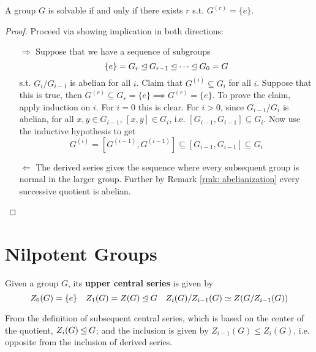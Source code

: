 \begin{proposition}\label{prop: group solvable iff derived series terminate}
    A group $G$ is solvable if and only if there exists $r$ s.t. $G^{(r)} = \{e\}$.
\end{proposition}

\begin{proof}
    Proceed via showing implication in both directions:
    \begin{enumerate}
        \item[$\Rightarrow$] Suppose that we have a sequence of subgroups
        \[
            \{e\} = G_r \unlhd G_{r-1} \unlhd \cdots \unlhd G_0 = G
        \]
        s.t. $G_i/G_{i-1}$ is abelian for all $i$. Claim that $G^{(i)} \subseteq G_i$ for all $i$. Suppose that this is true, then $G^{(r)} \subseteq G_r = \{e\} \implies G^{(r)} = \{e\}$. To prove the claim, apply induction on $i$. For $i = 0$ this is clear. For $i > 0$, since $G_{i-1}/G_i$ is abelian, for all $x, y \in G_{i-1}$, $[x, y] \in G_i$, i.e. $[G_{i-1}, G_{i-1}] \subseteq G_i$. Now use the inductive hypothesis to get
        \[
            G^{(i)} = [G^{(i-1)}, G^{(i-1)}] \subseteq [G_{i-1}, G_{i-1}] \subseteq G_i
        \]
        \item[$\Leftarrow$] The derived series gives the sequence where every subsequent group is normal in the larger group. Further by Remark \ref{rmk: abelianization} every successive quotient is abelian. 
    \end{enumerate}
\end{proof}

\clearpage
\section{Nilpotent Groups}

\begin{definition}
    Given a group $G$, its \textbf{upper central series} is given by
    \[
        Z_0(G) = \{e\} \quad Z_1(G) = Z(G) \unlhd G \quad Z_i(G)/Z_{i-1}(G) \simeq Z(G/Z_{i-1}(G)) 
    \]
\end{definition}

\begin{remark}
    From the definition of subsequent central series, which is based on the center of the quotient, $Z_i(G) \unlhd G$; and the inclusion is given by $Z_{i-1}(G) \leq Z_i(G)$, i.e. opposite from the inclusion of derived series.
\end{remark}


